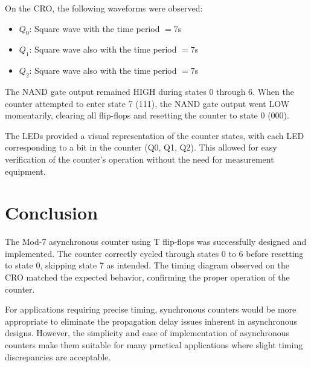 \documentclass[12pt]{article}
\begin{document}
On the CRO, the following waveforms were observed:
\begin{itemize}
    \item $Q_0$: Square wave with the time period $= 7$s
    \item $Q_1$: Square wave also with the time period $= 7$s
    \item $Q_2$: Square wave also with the time period $= 7$s
\end{itemize}

The NAND gate output remained HIGH during states 0 through 6. When the counter attempted to enter state 7 (111), the NAND gate output went LOW momentarily, clearing all flip-flops and resetting the counter to state 0 (000).

The LEDs provided a visual representation of the counter states, with each LED corresponding to a bit in the counter (Q0, Q1, Q2). This allowed for easy verification of the counter's operation without the need for measurement equipment.

\section{Conclusion}

The Mod-7 asynchronous counter using T flip-flops was successfully designed and implemented. The counter correctly cycled through states 0 to 6 before resetting to state 0, skipping state 7 as intended. The timing diagram observed on the CRO matched the expected behavior, confirming the proper operation of the counter.

For applications requiring precise timing, synchronous counters would be more appropriate to eliminate the propagation delay issues inherent in asynchronous designs. However, the simplicity and ease of implementation of asynchronous counters make them suitable for many practical applications where slight timing discrepancies are acceptable.
\end{document}
